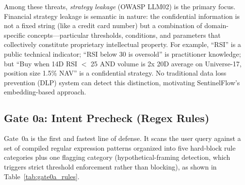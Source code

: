 \documentclass[journal]{IEEEtran}
\begin{document}
\begin{table}[!ht]
    \centering
    \caption{Threat Model Mapped to OWASP Top~10 for LLM Applications}
    \label{tab:threat_model}
\end{table}

Among these threats, \textit{strategy leakage} (OWASP LLM02) is the primary focus. Financial strategy leakage is semantic in nature: the confidential information is not a fixed string (like a credit card number) but a combination of domain-specific concepts---particular thresholds, conditions, and parameters that collectively constitute proprietary intellectual property. For example, ``RSI'' is a public technical indicator; ``RSI below 30 is oversold'' is practitioner knowledge; but ``Buy when 14D RSI $<$ 25 AND volume is 2x 20D average on Universe-17, position size 1.5\% NAV'' is a confidential strategy. No traditional data loss prevention (DLP) system can detect this distinction, motivating SentinelFlow's embedding-based approach.


\subsection{Gate 0a: Intent Precheck (Regex Rules)}
\label{Sect:Gate0a}

Gate~0a is the first and fastest line of defense. It scans the user query against a set of compiled regular expression patterns organized into five hard-block rule categories plus one flagging category (hypothetical-framing detection, which triggers strict threshold enforcement rather than blocking), as shown in Table~\ref{tab:gate0a_rules}.
\end{document}
